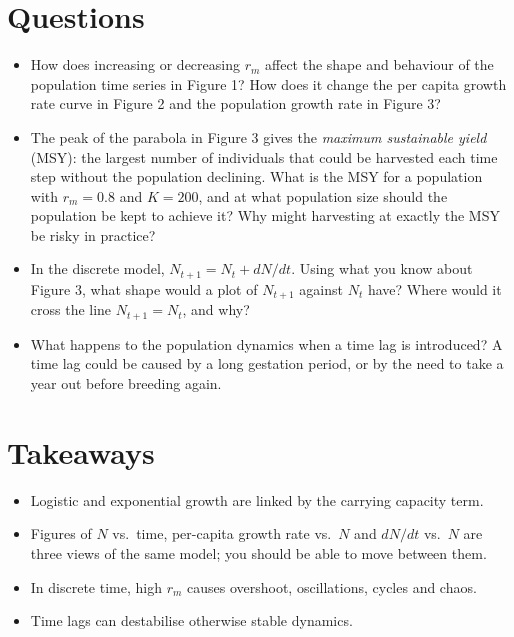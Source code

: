 \documentclass[
  a4paper]{book}
\providecommand{\tightlist}{%
  \setlength{\itemsep}{0pt}\setlength{\parskip}{0pt}}
\begin{document}
\section{Questions}\label{questions-6}

\begin{itemize}
\tightlist
\item
  How does increasing or decreasing \(r_m\) affect the shape and behaviour of the population time series in Figure 1? How does it change the per capita growth rate curve in Figure 2 and the population growth rate in Figure 3?
\end{itemize}

\begin{itemize}
\tightlist
\item
  The peak of the parabola in Figure 3 gives the \emph{maximum sustainable yield} (MSY): the largest number of individuals that could be harvested each time step without the population declining. What is the MSY for a population with \(r_m = 0.8\) and \(K = 200\), and at what population size should the population be kept to achieve it? Why might harvesting at exactly the MSY be risky in practice?
\end{itemize}

\begin{itemize}
\tightlist
\item
  In the discrete model, \(N_{t+1} = N_t + dN/dt\). Using what you know about Figure 3, what shape would a plot of \(N_{t+1}\) against \(N_t\) have? Where would it cross the line \(N_{t+1} = N_t\), and why?
\end{itemize}

\begin{itemize}
\tightlist
\item
  What happens to the population dynamics when a time lag is introduced? A time lag could be caused by a long gestation period, or by the need to take a year out before breeding again.
\end{itemize}

\section{Takeaways}\label{takeaways-6}

\begin{itemize}
\tightlist
\item
  Logistic and exponential growth are linked by the carrying capacity term.
\item
  Figures of \(N\) vs.~time, per-capita growth rate vs.~\(N\) and \(dN/dt\) vs.~\(N\) are three views of the same model; you should be able to move between them.
\item
  In discrete time, high \(r_m\) causes overshoot, oscillations, cycles and chaos.
\item
  Time lags can destabilise otherwise stable dynamics.
\end{itemize}
\end{document}
